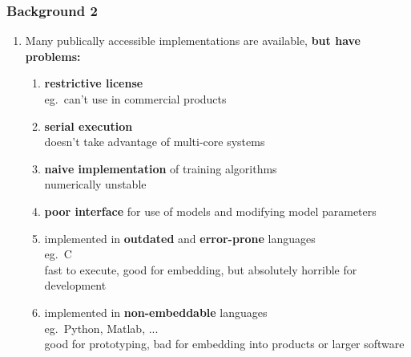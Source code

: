 \documentclass[usenames,dvipsnames]{beamer}
\begin{document}
%
%
%

\begin{frame}
\frametitle{Background 2}

\begin{enumerate}[{~~$\boldsymbol{\bullet}$}]

\item Many publically accessible implementations are available, {\bf but have problems:}

\begin{enumerate}[{$\boldsymbol{\rightarrow}$}]
\renewcommand{\itemsep}{0.9ex}
\item 
{\bf restrictive license}\\
eg.~can't use in commercial products

\item
{\bf serial execution}\\
doesn't take advantage of multi-core systems

\item
{\bf naive implementation} of training algorithms\\
numerically unstable

\item
{\bf poor interface} for use of models and modifying model parameters

\item
implemented in {\bf outdated} and {\bf error-prone} languages\\
eg.~C\\
fast to execute, good for embedding, but absolutely horrible for development

\item
implemented in {\bf non-embeddable} languages\\
eg.~Python, Matlab, ...\\
good for prototyping, bad for embedding into products or larger software

\end{enumerate}

\end{enumerate}
\end{frame}

%
%
%
\end{document}
